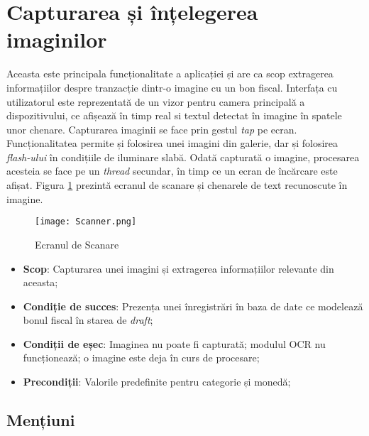 \section{Capturarea și înțelegerea imaginilor}\label{understanding_spec}



Aceasta este principala funcționalitate a aplicației și are ca scop extragerea informațiilor despre tranzacție dintr-o imagine cu un bon fiscal. Interfața cu utilizatorul este reprezentată de un vizor pentru camera principală a dispozitivului, ce afișează în timp real si textul detectat în imagine în spatele unor chenare.  Capturarea imaginii se face prin gestul \emph{tap} pe ecran. Funcționalitatea permite și folosirea unei imagini din galerie, dar și folosirea \emph{flash-ului} în condițiile de iluminare slabă. Odată capturată o imagine, procesarea acesteia se face pe un \emph{thread} secundar, în timp ce un ecran de încărcare este afișat. Figura \ref{fig:scanner} prezintă ecranul de scanare și chenarele de text recunoscute în imagine.

\begin{figure}[ht]
  \centering
  \texttt{[image: Scanner.png]}
  \caption{Ecranul de Scanare}
  \label{fig:scanner}
\end{figure}

\begin{itemize}
\item
  \textbf{Scop}: Capturarea unei imagini și extragerea informațiilor relevante din aceasta;
\item
  \textbf{Condiție de succes}: Prezența unei înregistrări în baza de date ce modelează bonul fiscal în starea de \emph{draft};
\item
  \textbf{Condiții de eșec}: Imaginea nu poate fi capturată; modulul OCR nu funcționează; o imagine este deja în curs de procesare;
\item
  \textbf{Precondiții}: Valorile predefinite pentru categorie și monedă;
\end{itemize}

\subsection*{Mențiuni}

